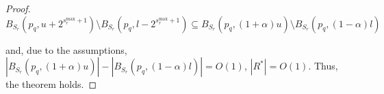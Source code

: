 \begin{proof}
\begin{equation}
B_{S_r}(p_q, u + 2^{s_r^{\max} + 1}) \setminus B_{S_r}(p_q, l - 2^{s_r^{\max} +
1}) \subseteq B_{S_r}(p_q, (1 + \alpha) u) \setminus B_{S_r}(p_q, (1 - \alpha)
l)
\end{equation}

\noindent and, due to the assumptions, $| B_{S_r}(p_q, (1 + \alpha) u) | - |
B_{S_r}(p_q, (1 - \alpha) l) | = O(1)$, $|R^*| = O(1)$.  Thus, the theorem
holds.
\end{proof}

%





